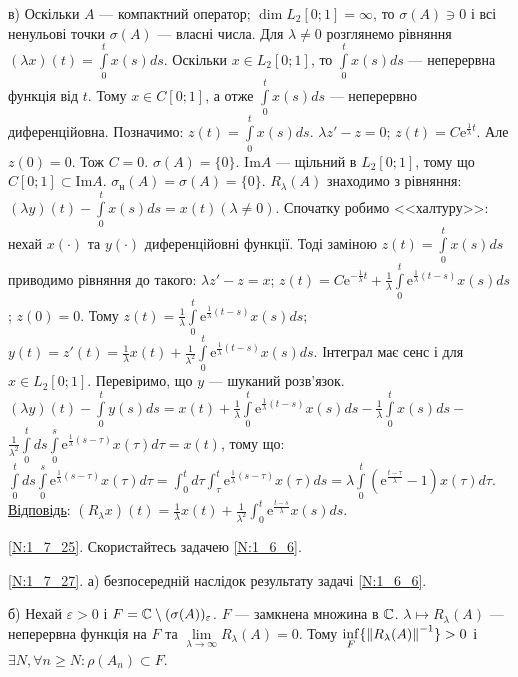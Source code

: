 \noindent в) Оскільки $A$ --- компактний оператор; $\dim L_2  [0; 1] = \infty$, то $\sigma(A) \ni 0$ і всі ненульові точки $\sigma(A)$ --- 
власні числа. Для $\lambda \neq 0$ розглянемо рівняння $(\lambda x)(t) = \int\limits_0^t x(s) ds$. Оскільки $x \in L_2 [0;1]$, то $\int\limits_0^t x(s) ds$ ---
неперервна функція від $t$. Тому $x \in C[0;1]$, а отже $\int\limits_0^t x(s) ds$ --- неперервно диференційовна.
Позначимо: $z(t) = \int\limits_0^t x(s) ds$. $\lambda z' - z = 0$; $z(t) = C \mathrm{e}^{\frac{1}{\lambda}t}$. Але $z(0) = 0$. Тож $C = 0$.
$\sigma(A) = \{0\}$. $\mathrm{Im} A$ --- щільний в $L_2 [0;1]$, тому що $C[0;1] \subset \mathrm{Im}A$. $\sigma_{\text{н}} (A) = \sigma(A) = \{0\}$.
$R_{\lambda} (A)$ знаходимо з рівняння: $(\lambda y)(t) - \int\limits_0^t x(s) ds = x(t) (\lambda \neq 0)$. Спочатку робимо <<халтуру>>: нехай $x(\cdot)$ та
$y(\cdot)$ диференційовні функції. Тоді заміною $z(t) = \int\limits_0^t x(s) ds$ приводимо рівняння до такого: $\lambda z' - z = x$; 
$z(t) = C\mathrm{e}^{-\frac{1}{\lambda} t} + \frac{1}{\lambda} \int\limits_0^t \mathrm{e}^{\frac{1}{\lambda}(t-s)} x(s) ds$;
$z(0) = 0$. Тому $z(t) = \frac{1}{\lambda} \int\limits_0^t \mathrm{e}^{\frac{1}{\lambda}(t-s)} x(s) ds$; 
$y(t) = z'(t) = \frac{1}{\lambda}x(t) + \frac{1}{\lambda^2} \int\limits_0^t \mathrm{e}^{\frac{1}{\lambda}(t-s)} x(s) ds$.
Інтеграл має сенс і для $x \in L_2 [0;1]$. Перевіримо, що $y$ --- шуканий розв'язок.
$(\lambda y)(t) - \int\limits_0^t y(s) ds = x(t) + \frac{1}{\lambda} \int\limits_0^t \mathrm{e}^{\frac{1}{\lambda}(t-s)} x(s) ds - \frac{1}{\lambda} \int\limits_0^t x(s) ds - $
$\frac{1}{\lambda^2} \int\limits_0^t ds \int\limits_0^s \mathrm{e}^{\frac{1}{\lambda}(s-\tau)} x(\tau) d\tau = x(t)$, тому що:
$\int\limits_0^t ds \int\limits_0^s \mathrm{e}^{\frac{1}{\lambda}(s-\tau)} x(\tau) d\tau = \int_0^t d\tau \int_{\tau}^t \mathrm{e}^{\frac{1}{\lambda}(s - \tau)}x(\tau)ds = \lambda \int\limits_0^t (\mathrm{e}^{\frac{t - \tau}{\lambda}} - 1)x(\tau)d\tau$.
\underline{Відповідь}: $(R_{\lambda} x)(t) = \frac{1}{\lambda}x(t)+\frac{1}{\lambda^2}\int_0^t \mathrm{e}^{\frac{t-s}{\lambda}}x(s)ds$.

\noindent\ref{N:1_7_25}. Скористайтесь задачею \ref{N:1_6_6}.

\noindent\ref{N:1_7_27}. а) безпосередній наслідок результату задачі \ref{N:1_6_6}.

\noindent б) Нехай $\varepsilon > 0$ і $F = \mathbb{C} \setminus (\sigma(A))_{\varepsilon}$. $F$ --- замкнена множина в $\mathbb{C}$.
$\lambda \mapsto R_{\lambda} (A)$ --- неперервна функція на $F$ та $\lim\limits_{\lambda \rightarrow \infty} R_{\lambda} (A) = 0$.
Тому $\inf\limits_F \{ \left\lVert R_{\lambda} (A)\right\rVert^{-1} \} > 0$ і $\exists N, \forall n \geq N: \rho (A_n) \subset F$.

